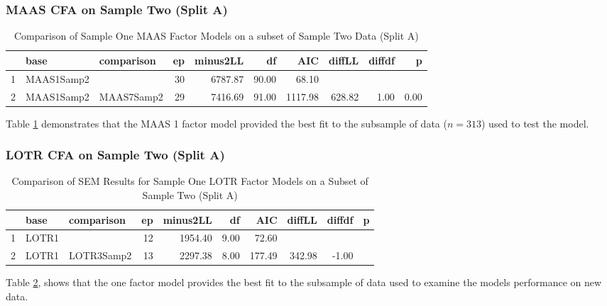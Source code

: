 \documentclass{article}
\begin{document}
\subsubsection{MAAS CFA on Sample Two (Split A)}
\label{sec:maas-cfa-sample}










\begin{table}[ht]
\centering
\begin{tabular}{rllrrrrrrr}
  \hline
 & base & comparison & ep & minus2LL & df & AIC & diffLL & diffdf & p \\ 
  \hline
1 & MAAS1Samp2 &  &  30 & 6787.87 & 90.00 & 68.10 &  &  &  \\ 
  2 & MAAS1Samp2 & MAAS7Samp2 &  29 & 7416.69 & 91.00 & 1117.98 & 628.82 & 1.00 & 0.00 \\ 
   \hline
\end{tabular}
\caption{Comparison of Sample One MAAS Factor Models on a subset of Sample Two Data (Split A)} 
\label{tab:maassemcompare2}
\end{table}
Table \ref{tab:maassemcompare2} demonstrates that the MAAS 1 factor model provided the best fit to the subsample of data ($n=313$) used to test the model.

\subsubsection{LOTR CFA on Sample Two (Split A)}
\label{sec:lotr-cfa-sample}






\begin{table}[ht]
\centering
\begin{tabular}{rllrrrrrrr}
  \hline
 & base & comparison & ep & minus2LL & df & AIC & diffLL & diffdf & p \\ 
  \hline
1 & LOTR1 &  &  12 & 1954.40 & 9.00 & 72.60 &  &  &  \\ 
  2 & LOTR1 & LOTR3Samp2 &  13 & 2297.38 & 8.00 & 177.49 & 342.98 & -1.00 &  \\ 
   \hline
\end{tabular}
\caption{Comparison of SEM Results for Sample One LOTR Factor Models on a Subset of Sample Two (Split A)} 
\label{tab:lotrcompare2}
\end{table}
Table \ref{tab:lotrcompare2}, shows that the one factor model provides the best fit to the subsample of data used to examine the models performance on new data.
\end{document}
